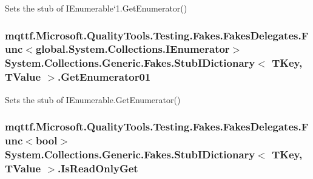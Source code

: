 Sets the stub of I\-Enumerable`1.Get\-Enumerator()

\hypertarget{class_system_1_1_collections_1_1_generic_1_1_fakes_1_1_stub_i_dictionary_3_01_t_key_00_01_t_value_01_4_a721781bbf2fc1fca79be7004d20decb8}{
\subsubsection[{Get\-Enumerator01}]{\setlength{\rightskip}{0pt plus 5cm}mqttf.\-Microsoft.\-Quality\-Tools.\-Testing.\-Fakes.\-Fakes\-Delegates.\-Func$<$global.\-System.\-Collections.\-I\-Enumerator$>$ System.\-Collections.\-Generic.\-Fakes.\-Stub\-I\-Dictionary$<$ T\-Key, T\-Value $>$.Get\-Enumerator01}}\label{class_system_1_1_collections_1_1_generic_1_1_fakes_1_1_stub_i_dictionary_3_01_t_key_00_01_t_value_01_4_a721781bbf2fc1fca79be7004d20decb8}


Sets the stub of I\-Enumerable.\-Get\-Enumerator()

\hypertarget{class_system_1_1_collections_1_1_generic_1_1_fakes_1_1_stub_i_dictionary_3_01_t_key_00_01_t_value_01_4_ad187a35b710736b66b7cc14bdf29b7e8}{
\subsubsection[{Is\-Read\-Only\-Get}]{\setlength{\rightskip}{0pt plus 5cm}mqttf.\-Microsoft.\-Quality\-Tools.\-Testing.\-Fakes.\-Fakes\-Delegates.\-Func$<$bool$>$ System.\-Collections.\-Generic.\-Fakes.\-Stub\-I\-Dictionary$<$ T\-Key, T\-Value $>$.Is\-Read\-Only\-Get}}\label{class_system_1_1_collections_1_1_generic_1_1_fakes_1_1_stub_i_dictionary_3_01_t_key_00_01_t_value_01_4_ad187a35b710736b66b7cc14bdf29b7e8}


